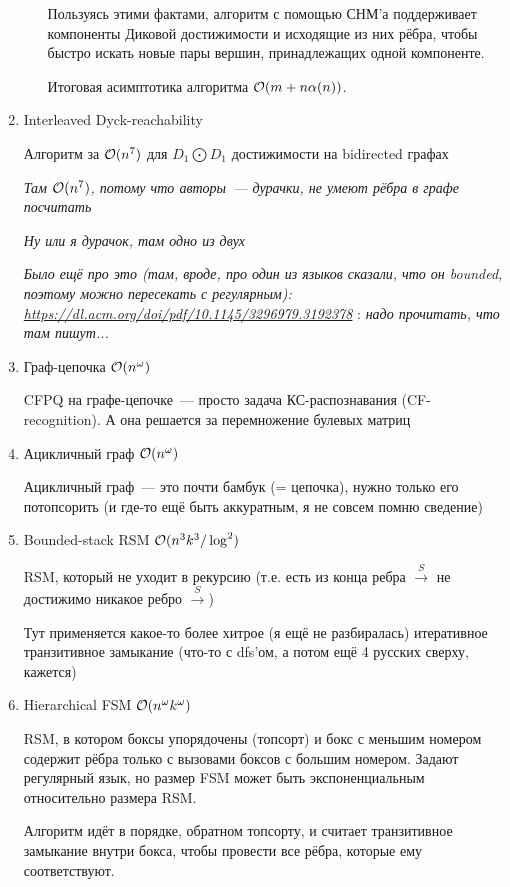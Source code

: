 \begin{enumerate}
\begin{itemize}
        Пользуясь этими фактами, алгоритм с помощью СНМ'а поддерживает компоненты Диковой достижимости и исходящие из них рёбра, чтобы быстро искать новые пары вершин, принадлежащих одной компоненте.

        Итоговая асимптотика алгоритма $\mathcal{O}(m + n \alpha(n))$.
    \end{itemize}

    \item Interleaved Dyck-reachability

        Алгоритм за $\mathcal{O}(n^7)$ для $D_1 \bigodot D_1$ достижимости на bidirected графах~\cite{Li21}

        \textit{Там $\mathcal{O}(n^7)$, потому что авторы~--- дурачки, не умеют рёбра в графе посчитать}

        \textit{Ну или я дурачок, там одно из двух}

        \textit{Было ещё про это (там, вроде, про один из языков сказали, что он bounded, поэтому можно пересекать с регулярным): 
        \url{https://dl.acm.org/doi/pdf/10.1145/3296979.3192378}}
        \TODO: \textit{надо прочитать, что там пишут...}

    \item Граф-цепочка $\mathcal{O}(n^{\omega})$ \cite{Valiant1975}

        CFPQ на графе-цепочке~--- просто задача КС-распознавания (CF-recognition). А она решается за перемножение булевых матриц \cite{Valiant1975}

    \item Ацикличный граф $\mathcal{O}(n^{\omega})$ \cite{Yannakakis1990}

        Ацикличный граф~--- это почти бамбук (= цепочка), нужно только его потопсорить (и где-то ещё быть аккуратным, я не совсем помню сведение)

    \item Bounded-stack RSM $\mathcal{O}(n^3 k^3 / \log^2)$ \cite{Chaudhuri08}

        RSM, который не уходит в рекурсию (т.е. есть из конца ребра $\xrightarrow{S}$ не достижимо никакое ребро $\xrightarrow{S}$)

        Тут применяется какое-то более хитрое (я ещё не разбиралась) итеративное транзитивное замыкание (что-то с dfs'ом, а потом ещё 4 русских сверху, кажется)

    \item Hierarchical FSM $\mathcal{O}(n^{\omega} k^{\omega})$ \cite{Chaudhuri08}

        RSM, в котором боксы упорядочены (топсорт) и бокс с меньшим номером содержит рёбра только с вызовами боксов с большим номером. Задают регулярный язык, но размер FSM может быть экспоненциальным относительно размера RSM.

        Алгоритм идёт в порядке, обратном топсорту, и считает транзитивное замыкание внутри бокса, чтобы провести все рёбра, которые ему соответствуют.

\end{enumerate}

